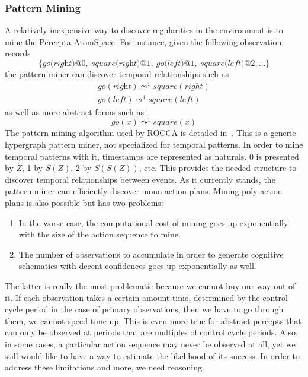 \documentclass[runningheads]{llncs}
\newcommand{\lpreimp}[1]{\leadsto^{#1}}
\newcommand{\lgo}[1]{\textit{go}(#1)}
\begin{document}
\subsubsection{Pattern Mining}
A relatively inexpensive way to discover regularities in the
environment is to mine the Percepta AtomSpace.  For instance, given
the following observation records
$$\{\textit{go(right)@0},\ \textit{square(right)@1},\
\textit{go(left)@1},\ \textit{square(left)@2}, \dots\}$$ the pattern
miner can discover temporal relationships such as
$$
\begin{array}{c}
  \lgo{\textit{right}} \lpreimp{1} square(right) \\
  \lgo{\textit{left}} \lpreimp{1} square(left)
\end{array}
$$
as well as more abstract forms such as
$$\lgo{x} \lpreimp{1} square(x)$$
The pattern mining algorithm used by ROCCA is detailed
in~\cite{Geisweiller2019}.  This is a generic hypergraph pattern
miner, not specialized for temporal patterns.  In order to mine
temporal patterns with it, timestamps are represented as naturals.  0
is presented by $Z$, 1 by $S(Z)$, 2 by $S(S(Z))$, etc.  This provides
the needed structure to discover temporal relationships between
events.  As it currently stands, the pattern miner can efficiently
discover mono-action plans.  Mining poly-action plans is also possible
but has two problems:
\begin{enumerate}
\item In the worse case, the computational cost of mining goes up
  exponentially with the size of the action sequence to mine.
\item The number of observations to accumulate in order to generate
  cognitive schematics with decent confidences goes up exponentially
  as well.
\end{enumerate}
The latter is really the most problematic because we cannot buy our
way out of it.  If each observation takes a certain amount time,
determined by the control cycle period in the case of primary
observations, then we have to go through them, we cannot speed time
up.  This is even more true for abstract percepts that can only be
observed at periods that are multiples of control cycle periods.
Also, in some cases, a particular action sequence may never be
observed at all, yet we still would like to have a way to estimate the
likelihood of its success.  In order to address these limitations and
more, we need reasoning.
\end{document}
